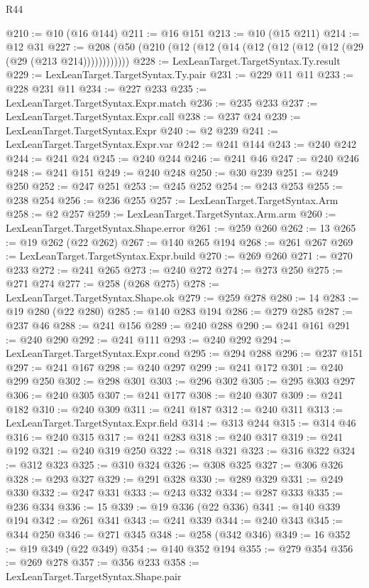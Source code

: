 \begin{lexlean}{R44}
\begin{coremodule}
@210 := @10 (@16 @144)
@211 := @16 @151
@213 := @10 (@15 @211)
@214 := @12 @31
@227 := @208 (@50 (@210 (@12 (@12 (@14 (@12 (@12 (@12 (@12 (@29 (@29 (@213 @214))))))))))))
@228 := LexLeanTarget.TargetSyntax.Ty.result
@229 := LexLeanTarget.TargetSyntax.Ty.pair
@231 := @229 @11 @11
@233 := @228 @231 @11
@234 := @227 @233
@235 := LexLeanTarget.TargetSyntax.Expr.match
@236 := @235 @233
@237 := LexLeanTarget.TargetSyntax.Expr.call
@238 := @237 @24
@239 := LexLeanTarget.TargetSyntax.Expr
@240 := @2 @239
@241 := LexLeanTarget.TargetSyntax.Expr.var
@242 := @241 @144
@243 := @240 @242
@244 := @241 @24
@245 := @240 @244
@246 := @241 @46
@247 := @240 @246
@248 := @241 @151
@249 := @240 @248
@250 := @30 @239
@251 := @249 @250
@252 := @247 @251
@253 := @245 @252
@254 := @243 @253
@255 := @238 @254
@256 := @236 @255
@257 := LexLeanTarget.TargetSyntax.Arm
@258 := @2 @257
@259 := LexLeanTarget.TargetSyntax.Arm.arm
@260 := LexLeanTarget.TargetSyntax.Shape.error
@261 := @259 @260
@262 := 13
@265 := @19 @262 (@22 @262)
@267 := @140 @265 @194
@268 := @261 @267
@269 := LexLeanTarget.TargetSyntax.Expr.build
@270 := @269 @260
@271 := @270 @233
@272 := @241 @265
@273 := @240 @272
@274 := @273 @250
@275 := @271 @274
@277 := @258 (@268 @275)
@278 := LexLeanTarget.TargetSyntax.Shape.ok
@279 := @259 @278
@280 := 14
@283 := @19 @280 (@22 @280)
@285 := @140 @283 @194
@286 := @279 @285
@287 := @237 @46
@288 := @241 @156
@289 := @240 @288
@290 := @241 @161
@291 := @240 @290
@292 := @241 @111
@293 := @240 @292
@294 := LexLeanTarget.TargetSyntax.Expr.cond
@295 := @294 @288
@296 := @237 @151
@297 := @241 @167
@298 := @240 @297
@299 := @241 @172
@301 := @240 @299 @250
@302 := @298 @301
@303 := @296 @302
@305 := @295 @303 @297
@306 := @240 @305
@307 := @241 @177
@308 := @240 @307
@309 := @241 @182
@310 := @240 @309
@311 := @241 @187
@312 := @240 @311
@313 := LexLeanTarget.TargetSyntax.Expr.field
@314 := @313 @244
@315 := @314 @46
@316 := @240 @315
@317 := @241 @283
@318 := @240 @317
@319 := @241 @192
@321 := @240 @319 @250
@322 := @318 @321
@323 := @316 @322
@324 := @312 @323
@325 := @310 @324
@326 := @308 @325
@327 := @306 @326
@328 := @293 @327
@329 := @291 @328
@330 := @289 @329
@331 := @249 @330
@332 := @247 @331
@333 := @243 @332
@334 := @287 @333
@335 := @236 @334
@336 := 15
@339 := @19 @336 (@22 @336)
@341 := @140 @339 @194
@342 := @261 @341
@343 := @241 @339
@344 := @240 @343
@345 := @344 @250
@346 := @271 @345
@348 := @258 (@342 @346)
@349 := 16
@352 := @19 @349 (@22 @349)
@354 := @140 @352 @194
@355 := @279 @354
@356 := @269 @278
@357 := @356 @233
@358 := LexLeanTarget.TargetSyntax.Shape.pair

\end{coremodule}
\end{lexlean}
